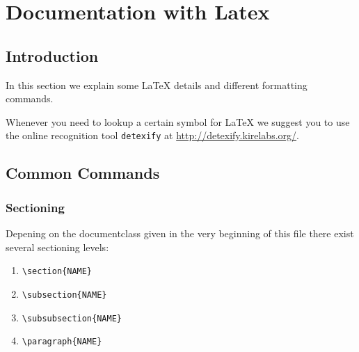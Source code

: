 \documentclass[10pt,a4paper]{scrartcl}
\begin{document}
\section{Documentation with Latex}
\subsection{Introduction} 

In this section we explain some \LaTeX\xspace details and different formatting
commands.

Whenever you need to lookup a certain symbol for \LaTeX\xspace we suggest you to use
the online recognition tool \texttt{detexify} at \url{http://detexify.kirelabs.org/}.


\subsection{Common Commands}
\subsubsection{Sectioning}
Depening on the documentclass given in the very beginning of this file there
exist several sectioning levels:
\begin{enumerate}
\item{} \verb$\section{NAME}$
\item{} \verb$\subsection{NAME}$
\item{} \verb$\subsubsection{NAME}$
\item{} \verb$\paragraph{NAME}$
\end{enumerate}
\end{document}
